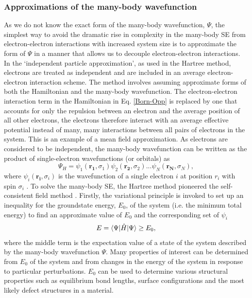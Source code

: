 \documentclass[11pt, twoside]{report}
\begin{document}
\subsubsection{Approximations of the many-body wavefunction}
As we do not know the exact form of the many-body wavefunction, $\Psi$, the simplest way to avoid the dramatic rise in complexity in the many-body SE from electron-electron interactions with increased system size is to approximate the form of $\Psi$ in a manner that allows us to decouple electron-electron interactions. In the `independent particle approximation', as used in the Hartree method, electrons are treated as independent and are included in an average electron-electron interaction scheme. The method involves assuming approximate forms of both the Hamiltonian and the many-body wavefunction. The electron-electron interaction term in the Hamiltonian in Eq. \ref{Born-Opp} is replaced by one that accounts for only the repulsion between an electron and the average position of all other electrons, the electrons therefore interact with an average effective potential instead of many, many interactions between all pairs of electrons in the system. This is an example of a mean field approximation.
As electrons are considered to be independent, the many-body wavefunction can be written as the product of single-electron wavefunctions (or orbitals) as
\begin{equation}\label{Hartree}
\Psi_H = \psi_1(\boldsymbol{r_1}, \sigma_1) \psi_2(\boldsymbol{r_2}, \sigma_2) ... \psi_N(\boldsymbol{r_N}, \sigma_N),
\end{equation}
where $\psi_i(\boldsymbol{r_i}, \sigma_i)$ is the wavefunction of a single electron $i$ at position $r_i$ with spin $\sigma_i$ \cite{Prasad_ch2}. 
To solve the many-body SE, the Hartree method pioneered the self-consistent field method \cite{RichardMartin_Ch1}. Firstly, the variational principle is invoked to set up an inequality for the groundstate energy, $E_0$, of the system (i.e. the minimum total energy) to find an approximate value of $E_0$ and the corresponding set of $\psi_i$
\begin{equation}\label{var_princip}
E = \braket{\Psi | \hat{H} | \Psi } \geq E_0,
\end{equation}
where the middle term is the expectation value of a state of the system described by the many-body wavefunction $\Psi$. Many properties of interest can be determined from $E_0$ of the system and from changes in the energy of the system in response to particular perturbations. $E_0$ can be used to determine various structural properties such as equilibrium bond lengths, surface configurations and the most likely defect structures in a material.
\end{document}
